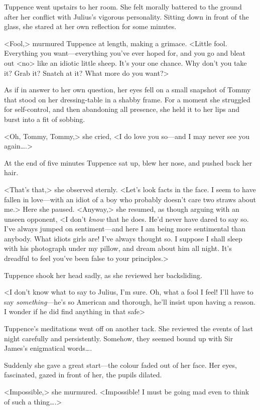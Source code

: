 Tuppence went upstairs to her room. She felt morally battered to the ground after her conflict with Julius's vigorous personality. Sitting down in front of the glass, she stared at her own reflection for some minutes.

<Fool,> murmured Tuppence at length, making a grimace. <Little fool. Everything you want—everything you've ever hoped for, and you go and bleat out <no> like an idiotic little sheep. It's your one chance. Why don't you take it? Grab it? Snatch at it? What more do you want?>

As if in answer to her own question, her eyes fell on a small snapshot of Tommy that stood on her dressing-table in a shabby frame. For a moment she struggled for self-control, and then abandoning all presence, she held it to her lips and burst into a fit of sobbing.

<Oh, Tommy, Tommy,> she cried, <I do love you so—and I may never see you again\dots.>

At the end of five minutes Tuppence sat up, blew her nose, and pushed back her hair.

<That's that,> she observed sternly. <Let's look facts in the face. I seem to have fallen in love—with an idiot of a boy who probably doesn't care two straws about me.> Here she paused. <Anyway,> she resumed, as though arguing with an unseen opponent, <I don't \emph{know} that he does. He'd never have dared to say so. I've always jumped on sentiment—and here I am being more sentimental than anybody. What idiots girls are! I've always thought so. I suppose I shall sleep with his photograph under my pillow, and dream about him all night. It's dreadful to feel you've been false to your principles.>

Tuppence shook her head sadly, as she reviewed her backsliding.

<I don't know what to say to Julius, I'm sure. Oh, what a fool I feel! I'll have to say \emph{something}—he's so American and thorough, he'll insist upon having a reason. I wonder if he did find anything in that safe\longdash>

Tuppence's meditations went off on another tack. She reviewed the events of last night carefully and persistently. Somehow, they seemed bound up with Sir James's enigmatical words\dots.

Suddenly she gave a great start—the colour faded out of her face. Her eyes, fascinated, gazed in front of her, the pupils dilated.

<Impossible,> she murmured. <Impossible! I must be going mad even to think of such a thing\dots.>

